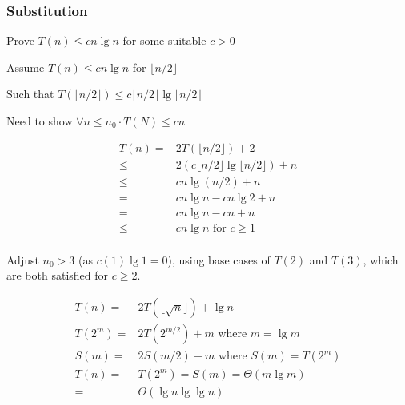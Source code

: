 \documentclass[10pt, a4paper,landscape]{article}
\begin{document}
\begin{multicols*}{4}

\subsubsection{Substitution}
\begin{compactitem}
    \item[Prove] $T(n) \leq cn \lg n$ for some suitable $c > 0$
    \item[Assume] $T(n) \leq cn \lg n$ for $\lfloor n / 2 \rfloor$
    \item[Such that] $T(\lfloor n / 2 \rfloor) \leq c \lfloor n / 2 \rfloor \lg \lfloor n / 2 \rfloor$
    \item [Need to show] $\forall n \leq n_0 \cdot T(N) \leq cn$
\end{compactitem}
\begin{align*}
T(n) =& 2T(\lfloor n / 2 \rfloor) + 2\\
     \leq& 2(c \lfloor n / 2 \rfloor \lg \lfloor n / 2 \rfloor) + n\\
     \leq& cn \lg(n /2) + n\\
     =& cn \lg n - cn \lg 2 + n\\
     =& cn \lg n - cn + n\\
     \leq&  cn \lg n \text{ for } c \geq 1\\
\end{align*}

Adjust $n_0 > 3$ (as $c(1)\lg 1 = 0$), using base cases of $T(2)$ and $T(3)$, which are both satisfied for $c \geq 2$.

\begin{align*}
    T(n) =& 2T(\lfloor \sqrt{n} \rfloor) + \lg n\\
    T(2^m) =& 2T(2^{m/2}) + m \text{ where } m = \lg m\\
    S(m) =& 2S(m / 2) + m \text{ where } S(m) = T(2^m)\\
    T(n) =& T(2^m) = S(m) = \Theta(m \lg m)\\
        =& \Theta(\lg n \lg \lg n)
\end{align*}


\end{multicols*}
\end{document}
